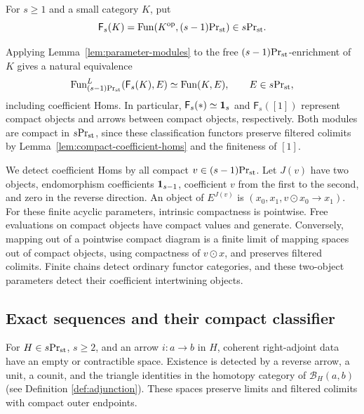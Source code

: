 \begin{definition}\label{def:free-linearization}
For $s\geq1$ and a small category $K$, put
\[
 \mathsf F_s(K)=\operatorname{Fun}(K^{\mathrm{op}},{(s-1)}\mathrm{Pr}_{\mathrm{st}})\in{s}\mathrm{Pr}_{\mathrm{st}}.
\]
\end{definition}

Applying Lemma~\ref{lem:parameter-modules} to the free
${(s-1)}\mathrm{Pr}_{\mathrm{st}}$-enrichment of $K$ gives a natural equivalence
\begin{equation}\label{eq:free-linearization-full-up}
 \operatorname{Fun}^L_{{(s-1)}\mathrm{Pr}_{\mathrm{st}}}(\mathsf F_s(K),E)
 \simeq\operatorname{Fun}(K,E),
 \qquad E\in{s}\mathrm{Pr}_{\mathrm{st}},
\end{equation}
including coefficient Homs.
In particular, $\mathsf F_s(*)\simeq\mathbf 1_s$ and
$\mathsf F_s([1])$ represent compact objects and arrows
between compact objects, respectively. Both modules are
compact in ${s}\mathrm{Pr}_{\mathrm{st}}$, since these classification functors
preserve filtered colimits by
Lemma~\ref{lem:compact-coefficient-homs}
and the finiteness of $[1]$.


\begin{remark}\label{rem:parameter-detection}
We detect coefficient Homs by all compact $v\in {(s-1)}\mathrm{Pr}_{\mathrm{st}}$. Let $J(v)$
have two objects, endomorphism coefficients $\mathbf 1_{s-1}$, coefficient
$v$ from the first to the second, and zero in the reverse direction.
An object of $E^{J(v)}$ is $(x_0,x_1,v\odot x_0\to x_1)$.
For these finite acyclic parameters, intrinsic compactness is
pointwise. Free evaluations on compact objects have compact values
and generate. Conversely, mapping out of a pointwise compact
diagram is a finite limit of mapping spaces out of compact objects,
using compactness of $v\odot x$, and preserves filtered colimits.
Finite chains detect ordinary functor categories, and these two-object
parameters detect their coefficient intertwining objects.
\end{remark}





\subsection{Exact sequences and their compact classifier}

\begin{lemma}\label{lem:matrix-adjunctions}
For $H\in{s}\mathrm{Pr}_{\mathrm{st}}$, $s\geq2$, and an arrow $i:a\to b$ in $H$, coherent
right-adjoint data have an empty or contractible space. Existence
is detected by a reverse arrow, a unit, a counit, and the triangle
identities in the homotopy category of $\mathcal B_H(a,b)$ (see Definition \ref{def:adjunction}).
These spaces preserve limits and filtered colimits with compact
outer endpoints.
\end{lemma}


